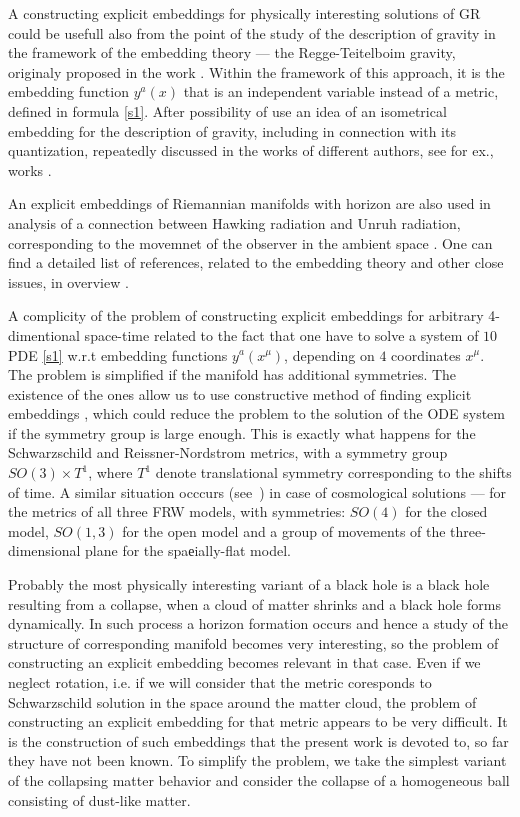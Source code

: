 \documentclass[12pt]{article}
\begin{document}
A constructing explicit embeddings for physically interesting solutions of GR could be usefull
also from the point of the study of the description of gravity in the framework of the embedding theory --- the Regge-Teitelboim gravity, originaly proposed in the work \cite{regge}.
Within the framework of this approach, it is the embedding function $y^a(x)$ that is an independent variable instead of a metric, defined in formula \eqref{s1}.
After \cite{regge} possibility of use an idea of an isometrical embedding for the description of gravity, including in connection with its quantization,
repeatedly discussed in the works of different authors, see for ex.,
works \cite{deser,pavsic85let,tapia,davkar,statja18,rojas09,statja25,faddeev,statja51}.

An explicit embeddings of Riemannian manifolds with horizon are also used in analysis of a connection between Hawking radiation and Unruh radiation, corresponding to the movemnet of the observer in the ambient space \cite{deserlev98,deserlev99,statja34,statja36}.
One can find a detailed list of references, related to the embedding theory and other close issues, in overview \cite{tapiaob}.

A complicity of the problem of constructing explicit embeddings for arbitrary 4-dimentional space-time related to the fact that one have to solve a system of $10$ PDE \eqref{s1} w.r.t embedding functions $y^a(x^\mu)$,
depending on $4$ coordinates $x^\mu$.
The problem is simplified if the manifold has additional symmetries.
The existence of the ones allow us to use constructive method of finding explicit embeddings \cite{statja27}, which could reduce the problem to the solution of the ODE system if the symmetry group is large enough.
This is exactly what happens for the Schwarzschild and Reissner-Nordstrom metrics, with a symmetry group $SO(3)\times T^1$, where $T^1$ denote translational symmetry
corresponding to the shifts of time. A similar situation occcurs (see~\cite{statja29}) in case of cosmological solutions ---
for the metrics of all three FRW models, with symmetries: $SO(4)$ for the closed model, $SO(1,3)$ for the open model
and a group of movements of the three-dimensional plane for the spaеially-flat model.

Probably the most physically interesting variant of a black hole is a black hole resulting from a collapse, when a cloud of matter shrinks and a black hole forms dynamically. In such process a horizon formation occurs
and hence a study of the structure of corresponding manifold becomes very interesting, so the problem of constructing an explicit embedding becomes relevant in that case.
Even if we neglect rotation, i.e. if we will consider that the metric coresponds to Schwarzschild solution in the space around the matter cloud, the problem of constructing an explicit embedding for that metric appears to be very difficult. It is the construction of such embeddings that the present work is devoted to, so far they have not been known.
To simplify the problem, we take the simplest variant of the collapsing matter behavior and consider the collapse of a homogeneous ball consisting of dust-like matter.
\end{document}
